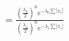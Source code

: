 \documentclass[preview]{standalone}
\begin{document}
\begin{align*}
= \frac{\left(\frac{\lambda_0}{2}\right)^n e^{-\lambda_0\sum |x_i|}}{\left(\frac{\lambda_1}{2}\right)^n e^{-\lambda_1\sum |x_i|}}
\end{align*}
\end{document}
